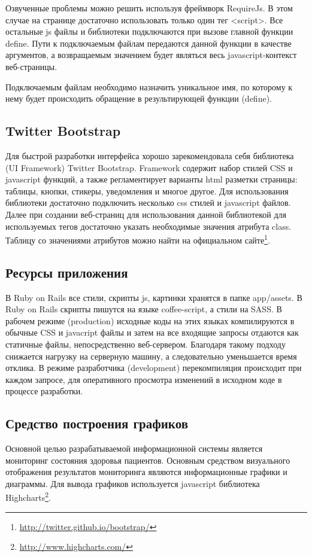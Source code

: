 Озвученные проблемы можно решить используя фреймворк RequireJs. В этом случае на
странице достаточно использовать только один тег <script>. Все остальные js
файлы и библиотеки подключаются при вызове главной функции define. Пути к
подключаемым файлам передаются данной функции в качестве аргументов, а
возвращаемым значением будет являться весь javascript-контекст веб-страницы.

Подключаемым файлам необходимо назначить уникальное имя, по которому к нему
будет происходить обращение в результирующей функции (define).

\subsection{Twitter Bootstrap}
Для быстрой разработки интерфейса хорошо зарекомендовала себя библиотека (UI
Framework) Twitter Bootstrap. Framework содержит набор стилей CSS и javascript
функций, а также регламентирует варианты html разметки страницы: таблицы,
кнопки, стикеры, уведомления и многое другое. Для использования библиотеки
достаточно подключить несколько css стилей и javascript файлов. Далее при
создании веб-страниц для использования данной библиотекой для используемых тегов
достаточно указать необходимые значения атрибута class. Таблицу со значениями
атрибутов можно найти на официальном сайте\footnote{
	\url{http://twitter.github.io/bootstrap/}
}.

\subsection{Ресурсы приложения}
В Ruby on Rails все стили, скрипты js, картинки хранятся в папке app/assets. В
Ruby on Rails скрипты пишутся на языке coffee-script, а стили на SASS. В рабочем
режиме (production) исходные коды на этих языках компилируются в обычные CSS и
javacript файлы и затем на все входящие запросы отдаются как статичные файлы,
непосредственно веб-сервером. Благодаря такому подходу снижается нагрузку на
серверную машину, а следовательно уменьшается время отклика. В режиме
разработчика (development) перекомпиляция происходит при каждом запросе, для
оперативного просмотра изменений в исходном коде в процессе разработки.

\subsection{Средство построения графиков}
Основной целью разрабатываемой информационной системы является мониторинг
состояния здоровья пациентов. Основным средством визуального отображения
результатов мониторинга являются информационные графики и диаграммы. Для вывода
графиков используется javascript библиотека Highcharts\footnote{
	\url{http://www.highcharts.com/}
}.
